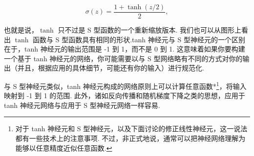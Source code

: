 \begin{equation}
\sigma(z) = \frac{1+\tanh(z/2)}{2},
\tag{111}
\end{equation}

\noindent 也就是说，$\tanh$ 只不过是 S 型函数的一个重新缩放版本. 我们也可以从图形上看出 $\tanh$ 函数与 S 型函数具有相同的形状.tanh 神经元与 S 型神经元的一个区别在于，tanh 神经元的输出范围是 -1 到 1，而不是 0 到 1. 这意味着如果你要构建一个基于 tanh 神经元的网络，你可能需要以与 S 型网络略有不同的方式对你的输出（并且，根据应用的具体细节，可能还有你的输入）进行规范化\label{term:59}.

与 S 型神经元类似，tanh 神经元构成的网络原则上可以计算任意函数*\footnote{对于 tanh 神经元和 S 型神经元，以及下面讨论的修正线性神经元，这一说法都有一些技术上的注意事项. 不过，非正式地说，通常可以把神经网络理解为能够以任意精度近似任意函数.}，将输入映射到 -1 到 1 的范围. 此外，诸如反向传播和随机梯度下降之类的思想，应用于 tanh 神经元网络与应用于 S 型神经元网络一样容易.

